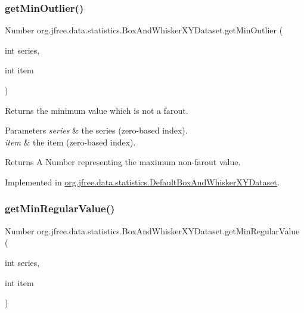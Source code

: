 \subsubsection{\texorpdfstring{get\+Min\+Outlier()}{getMinOutlier()}}
{\footnotesize\ttfamily Number org.\+jfree.\+data.\+statistics.\+Box\+And\+Whisker\+X\+Y\+Dataset.\+get\+Min\+Outlier (\begin{DoxyParamCaption}\item[{int}]{series,  }\item[{int}]{item }\end{DoxyParamCaption})}

Returns the minimum value which is not a farout. 
\begin{DoxyParams}{Parameters}
{\em series} & the series (zero-\/based index). \\
\hline
{\em item} & the item (zero-\/based index).\\
\hline
\end{DoxyParams}
\begin{DoxyReturn}{Returns}
A {\ttfamily Number} representing the maximum non-\/farout value. 
\end{DoxyReturn}


Implemented in \mbox{\hyperlink{classorg_1_1jfree_1_1data_1_1statistics_1_1_default_box_and_whisker_x_y_dataset_a0bf29647538b91763c23cb07f6aadf6c}{org.\+jfree.\+data.\+statistics.\+Default\+Box\+And\+Whisker\+X\+Y\+Dataset}}.

\mbox{\label{interfaceorg_1_1jfree_1_1data_1_1statistics_1_1_box_and_whisker_x_y_dataset_a11d53213d4eb15fd9691645b1b0edcb4}} 
\subsubsection{\texorpdfstring{get\+Min\+Regular\+Value()}{getMinRegularValue()}}
{\footnotesize\ttfamily Number org.\+jfree.\+data.\+statistics.\+Box\+And\+Whisker\+X\+Y\+Dataset.\+get\+Min\+Regular\+Value (\begin{DoxyParamCaption}\item[{int}]{series,  }\item[{int}]{item }\end{DoxyParamCaption})}

